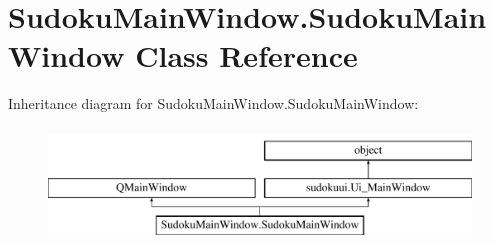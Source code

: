 \hypertarget{class_sudoku_main_window_1_1_sudoku_main_window}{\section{Sudoku\-Main\-Window.\-Sudoku\-Main\-Window Class Reference}
\label{class_sudoku_main_window_1_1_sudoku_main_window}
}
Inheritance diagram for Sudoku\-Main\-Window.\-Sudoku\-Main\-Window\-:\begin{figure}[H]
\begin{center}
\leavevmode
\includegraphics[height=3.000000cm]{class_sudoku_main_window_1_1_sudoku_main_window}
\end{center}
\end{figure}
